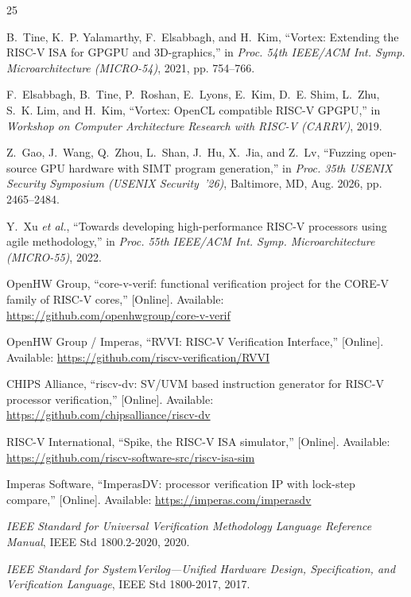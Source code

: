\documentclass[conference]{IEEEtran}
\begin{document}
\balance
\begin{thebibliography}{25}

	B.~Tine, K.~P. Yalamarthy, F.~Elsabbagh, and H.~Kim,
	``Vortex: Extending the RISC-V ISA for GPGPU and 3D-graphics,''
	in \emph{Proc. 54th IEEE/ACM Int. Symp. Microarchitecture (MICRO-54)},
	2021, pp. 754--766.

	F.~Elsabbagh, B.~Tine, P.~Roshan, E.~Lyons, E.~Kim, D.~E. Shim,
	L.~Zhu, S.~K. Lim, and H.~Kim,
	``Vortex: OpenCL compatible RISC-V GPGPU,''
	in \emph{Workshop on Computer Architecture Research with RISC-V (CARRV)},
	2019.

	Z.~Gao, J.~Wang, Q.~Zhou, L.~Shan, J.~Hu, X.~Jia, and Z.~Lv,
	``Fuzzing open-source GPU hardware with SIMT program generation,''
	in \emph{Proc. 35th USENIX Security Symposium (USENIX Security~'26)},
	Baltimore, MD, Aug. 2026, pp. 2465--2484.

	Y.~Xu \emph{et al.},
	``Towards developing high-performance RISC-V processors using agile
	methodology,'' in \emph{Proc. 55th IEEE/ACM Int. Symp.
		Microarchitecture (MICRO-55)}, 2022.

	OpenHW Group, ``core-v-verif: functional verification project for the
	CORE-V family of RISC-V cores,'' [Online]. Available:
	\url{https://github.com/openhwgroup/core-v-verif}

	OpenHW Group / Imperas, ``RVVI: RISC-V Verification Interface,''
	[Online]. Available: \url{https://github.com/riscv-verification/RVVI}

	CHIPS Alliance, ``riscv-dv: SV/UVM based instruction generator for
	RISC-V processor verification,'' [Online]. Available:
	\url{https://github.com/chipsalliance/riscv-dv}

	RISC-V International, ``Spike, the RISC-V ISA simulator,'' [Online].
	Available: \url{https://github.com/riscv-software-src/riscv-isa-sim}

	Imperas Software, ``ImperasDV: processor verification IP with
	lock-step compare,'' [Online]. Available:
	\url{https://imperas.com/imperasdv}

	\emph{IEEE Standard for Universal Verification Methodology Language
		Reference Manual}, IEEE Std 1800.2-2020, 2020.

	\emph{IEEE Standard for SystemVerilog---Unified Hardware Design,
		Specification, and Verification Language}, IEEE Std 1800-2017, 2017.


\end{thebibliography}
\end{document}
